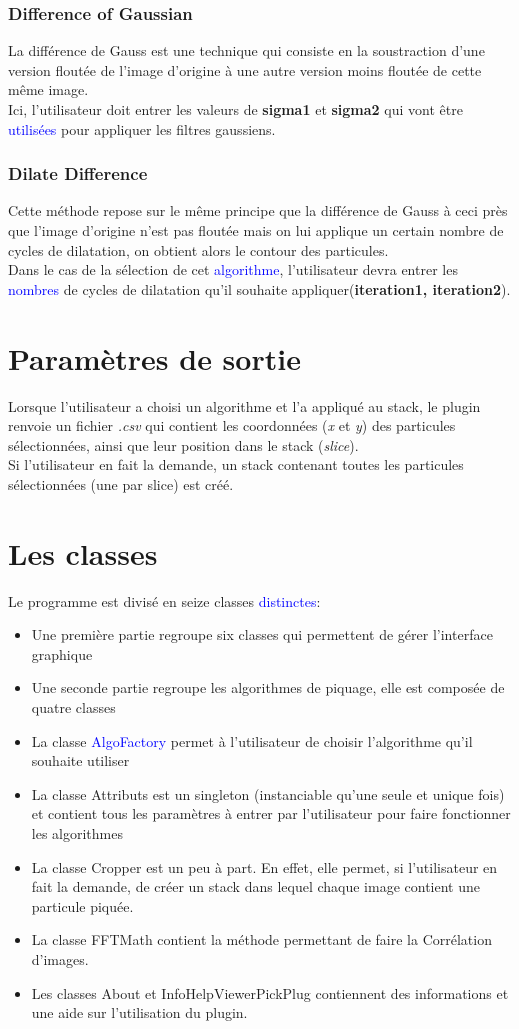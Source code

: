 \documentclass[11pt,a4paper]{report}
\begin{document}
\subsubsection{Difference of Gaussian}
La différence de Gauss est une technique qui consiste en la soustraction d'une version floutée de l'image d'origine à une autre version moins floutée de cette même image.\\
Ici, l'utilisateur doit entrer les valeurs de \textbf{sigma1} et \textbf{sigma2} qui vont être \textcolor{blue}{utilisées} pour appliquer les filtres gaussiens.
\subsubsection{Dilate Difference}
Cette méthode repose sur le même principe que la différence de Gauss à ceci près que l'image d'origine n'est pas floutée mais on lui applique un certain nombre de cycles de dilatation, on obtient alors le contour des particules.\\
Dans le cas de la sélection de cet \textcolor{blue}{algorithme}, l'utilisateur devra entrer les \textcolor{blue}{nombres} de cycles de dilatation qu'il souhaite appliquer(\textbf{iteration1, iteration2}).
\section{Paramètres de sortie}
Lorsque l'utilisateur a choisi un algorithme et l'a appliqué au stack, le plugin renvoie un fichier \emph{.csv} qui contient les coordonnées (\emph{x} et \emph{y}) des particules  sélectionnées, ainsi que leur position dans le stack (\emph{slice}).\\
Si l'utilisateur en fait la demande, un stack contenant toutes les particules sélectionnées (une par slice) est créé.
\section{Les classes}
Le programme est divisé en seize classes \textcolor{blue}{distinctes}:
\begin{itemize}
\item Une première partie regroupe six classes qui permettent de gérer l'interface graphique
\item Une seconde partie regroupe les algorithmes de piquage, elle est composée de quatre classes
\item La classe \textcolor{blue}{AlgoFactory} permet à l'utilisateur de choisir l'algorithme qu'il souhaite utiliser
\item La classe Attributs est un singleton (instanciable qu'une seule et unique fois) et contient tous les paramètres à entrer par l'utilisateur pour faire fonctionner les algorithmes
\item La classe Cropper est un peu à part. En effet, elle permet, si l'utilisateur en fait la demande, de créer un stack dans lequel chaque image contient une particule piquée.
\item La classe FFTMath contient la méthode permettant de faire la Corrélation d'images. 
\item Les classes About et InfoHelpViewerPickPlug contiennent des informations et une aide sur l'utilisation du plugin.
\end{itemize}
\end{document}

